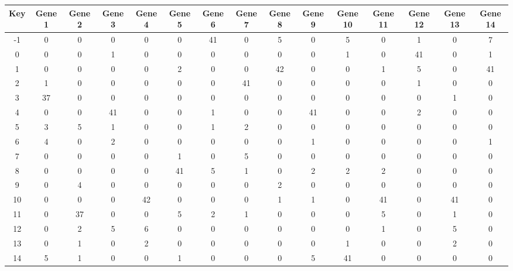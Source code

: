 \begin{tabular}{|c|c|c|c|c|c|c|c|c|c|c|c|c|c|c|}
\hline
Key & Gene 1 & Gene 2 & Gene 3 & Gene 4 & Gene 5 & Gene 6 & Gene 7 & Gene 8 & Gene 9 & Gene 10 & Gene 11 & Gene 12 & Gene 13 & Gene 14 \\
\hline
-1 & 0 & 0 & 0 & 0 & 0 & 41 & 0 & 5 & 0 & 5 & 0 & 1 & 0 & 7 \\
0 & 0 & 0 & 1 & 0 & 0 & 0 & 0 & 0 & 0 & 1 & 0 & 41 & 0 & 1 \\
1 & 0 & 0 & 0 & 0 & 2 & 0 & 0 & 42 & 0 & 0 & 1 & 5 & 0 & 41 \\
2 & 1 & 0 & 0 & 0 & 0 & 0 & 41 & 0 & 0 & 0 & 0 & 1 & 0 & 0 \\
3 & 37 & 0 & 0 & 0 & 0 & 0 & 0 & 0 & 0 & 0 & 0 & 0 & 1 & 0 \\
4 & 0 & 0 & 41 & 0 & 0 & 1 & 0 & 0 & 41 & 0 & 0 & 2 & 0 & 0 \\
5 & 3 & 5 & 1 & 0 & 0 & 1 & 2 & 0 & 0 & 0 & 0 & 0 & 0 & 0 \\
6 & 4 & 0 & 2 & 0 & 0 & 0 & 0 & 0 & 1 & 0 & 0 & 0 & 0 & 1 \\
7 & 0 & 0 & 0 & 0 & 1 & 0 & 5 & 0 & 0 & 0 & 0 & 0 & 0 & 0 \\
8 & 0 & 0 & 0 & 0 & 41 & 5 & 1 & 0 & 2 & 2 & 2 & 0 & 0 & 0 \\
9 & 0 & 4 & 0 & 0 & 0 & 0 & 0 & 2 & 0 & 0 & 0 & 0 & 0 & 0 \\
10 & 0 & 0 & 0 & 42 & 0 & 0 & 0 & 1 & 1 & 0 & 41 & 0 & 41 & 0 \\
11 & 0 & 37 & 0 & 0 & 5 & 2 & 1 & 0 & 0 & 0 & 5 & 0 & 1 & 0 \\
12 & 0 & 2 & 5 & 6 & 0 & 0 & 0 & 0 & 0 & 0 & 1 & 0 & 5 & 0 \\
13 & 0 & 1 & 0 & 2 & 0 & 0 & 0 & 0 & 0 & 1 & 0 & 0 & 2 & 0 \\
14 & 5 & 1 & 0 & 0 & 1 & 0 & 0 & 0 & 5 & 41 & 0 & 0 & 0 & 0 \\
\hline
\end{tabular}